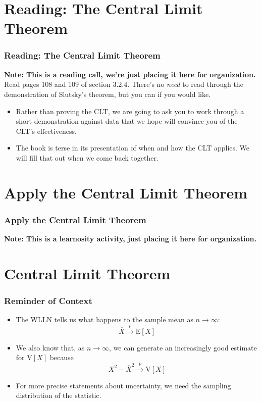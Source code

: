 \documentclass[12pt, block=fill]{beamer}
\newcommand{\E}{\text{E}}
\newcommand{\V}{\text{V}}
\begin{document}
\section{Reading: The Central Limit Theorem}

\begin{frame}
  \frametitle{Reading: The Central Limit Theorem} 
  \textbf{Note: This is a reading call, we're just placing it here for
    organization.}
  Read pages 108 and 109 of section 3.2.4. There's no \textit{need} to
  read through the demonstration of Slutsky's theorem, but you can if
  you would like.
  \begin{itemize} 
    \item Rather than proving the CLT, we are going to ask you to work
    through a short demonstration against data that we hope will
    convince you of the CLT's effectiveness.
  \item The book is terse in its presentation of when and how the CLT
    applies. We will fill that out when we come back together.
  \end{itemize} 
\end{frame}

 \section{Apply the Central Limit Theorem}

 \begin{frame}
   \frametitle{Apply the Central Limit Theorem}
  \textbf{Note: This is a learnosity activity, just placing it here
    for organization.}
 \end{frame}
 
\section{Central Limit Theorem}

\begin{frame}
  \frametitle{Reminder of Context}
  \begin{itemize} 
  \item The WLLN tells us what happens to the sample mean as $n
    \to \infty$: $$\overline{X} \overset{p}{\to} \E[X]$$
  \item We also know that, as $n \to \infty$, we can generate an
    increasingly good estimate for $\V[X]$ because $$\overline{X^{2}} -
    \overline{X}^{2} \overset{p}{\to} \V[X]$$
    \item For more precise statements about uncertainty, we need the sampling distribution of the statistic.
  \end{itemize} 


\end{frame}
\end{document}
